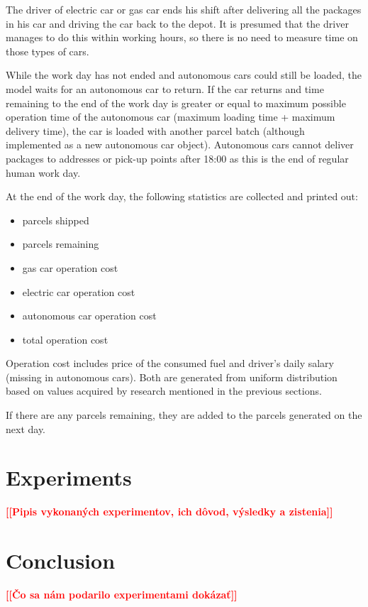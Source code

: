 \documentclass[a4paper, 11pt, a4paper]{article}
\newcommand{\todo}[1]{\textcolor{red}{\textbf{[[#1]]}}}
\begin{document}
The driver of electric car or gas car ends his shift after delivering all the
packages in his car and driving the car back to the depot. It is presumed that
the driver manages to do this within working hours, so there is no need to
measure time on those types of cars.

While the work day has not ended and autonomous cars could still be loaded, the
model waits for an autonomous car to return. If the car returns and time
remaining to the end of the work day is greater or equal to maximum possible
operation time of the autonomous car (maximum loading time + maximum delivery
time), the car is loaded with another parcel batch (although implemented
as a new autonomous car object). Autonomous cars cannot deliver packages to
addresses or pick-up points after 18:00 as this is the end of regular human work
day. \newline

\noindent At the end of the work day, the following statistics are collected and printed
out:
\begin{itemize}
    \item parcels shipped
    \item parcels remaining
    \item gas car operation cost
    \item electric car operation cost
    \item autonomous car operation cost
    \item total operation cost
\end{itemize}
Operation cost includes price of the consumed fuel and driver's daily salary
(missing in autonomous cars). Both are generated from uniform distribution based
on values acquired by research mentioned in the previous sections.

If there are any parcels remaining, they are added to the parcels generated on
the next day.

\section{Experiments}

\todo{Pipis vykonaných experimentov, ich dôvod, výsledky a zistenia}


\section{Conclusion}

\todo{Čo sa nám podarilo experimentami dokázať}


\newpage


\renewcommand{\refname}{Sources}

\end{document}
